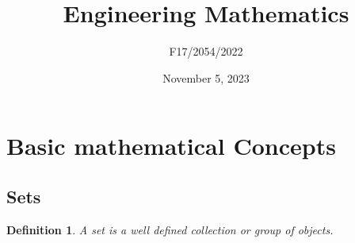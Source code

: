\documentclass[12pt]{report}
\title{\textbf{Engineering Mathematics}}
\author{F17/2054/2022}
\date{November 5, 2023}
\newtheorem{definition}{Definition}
\begin{document}
\maketitle

\chapter*{Basic mathematical Concepts}

\section*{Sets}
    \begin{definition}
        A set is a well defined collection or group of objects.
    \end{definition}
\end{document}
